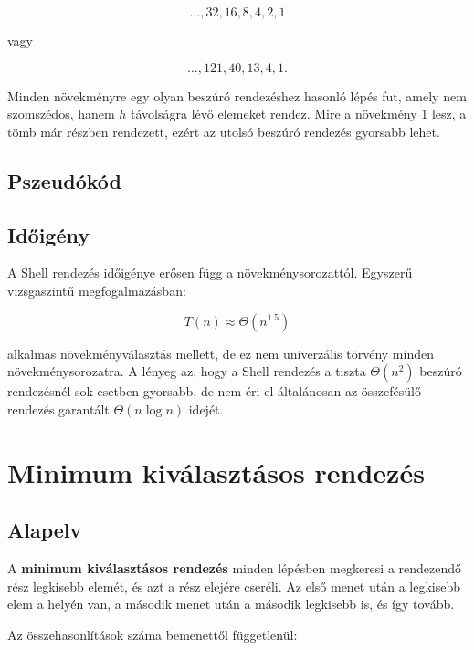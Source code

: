 \[
\dots, 32,16,8,4,2,1
\]

vagy

\[
\dots, 121,40,13,4,1.
\]

Minden növekményre egy olyan beszúró rendezéshez hasonló lépés fut, amely nem szomszédos, hanem $h$ távolságra lévő elemeket rendez. Mire a növekmény $1$ lesz, a tömb már részben rendezett, ezért az utolsó beszúró rendezés gyorsabb lehet.

\subsection{Pszeudókód}


\subsection{Időigény}

A Shell rendezés időigénye erősen függ a növekménysorozattól. Egyszerű vizsgaszintű megfogalmazásban:

\[
T(n) \approx \Theta(n^{1.5})
\]

alkalmas növekményválasztás mellett, de ez nem univerzális törvény minden növekménysorozatra. A lényeg az, hogy a Shell rendezés a tiszta $\Theta(n^2)$ beszúró rendezésnél sok esetben gyorsabb, de nem éri el általánosan az összefésülő rendezés garantált $\Theta(n\log n)$ idejét.

\section{Minimum kiválasztásos rendezés}

\subsection{Alapelv}

A \textbf{minimum kiválasztásos rendezés} minden lépésben megkeresi a rendezendő rész legkisebb elemét, és azt a rész elejére cseréli. Az első menet után a legkisebb elem a helyén van, a második menet után a második legkisebb is, és így tovább.


Az összehasonlítások száma bemenettől függetlenül:

